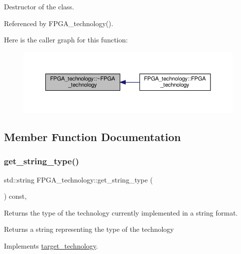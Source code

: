 Destructor of the class. 



Referenced by F\+P\+G\+A\+\_\+technology().

Here is the caller graph for this function\+:
\nopagebreak
\begin{figure}[H]
\begin{center}
\leavevmode
\includegraphics[width=350pt]{dd/ded/classFPGA__technology_a3d1ce24723204df9418d88cdb145f7bf_icgraph}
\end{center}
\end{figure}


\subsection{Member Function Documentation}
\mbox{\label{classFPGA__technology_a991bb1b03178c5db7a77d008bfba2aa3}} 
\subsubsection{\texorpdfstring{get\+\_\+string\+\_\+type()}{get\_string\_type()}}
{\footnotesize\ttfamily std\+::string F\+P\+G\+A\+\_\+technology\+::get\+\_\+string\+\_\+type (\begin{DoxyParamCaption}{ }\end{DoxyParamCaption}) const\hspace{0.3cm}{\ttfamily [override]}, {\ttfamily [virtual]}}



Returns the type of the technology currently implemented in a string format. 

\begin{DoxyReturn}{Returns}
a string representing the type of the technology 
\end{DoxyReturn}


Implements \hyperlink{classtarget__technology_a53355954503841a8ead7a8dc9889af85}{target\+\_\+technology}.



